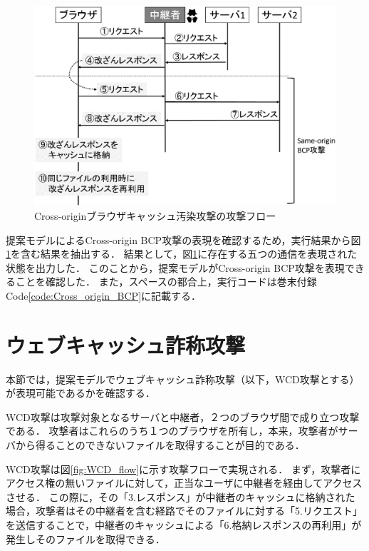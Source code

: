 \documentclass[12pt,a4paper]{jbook}
\begin{document}
\begin{figure}[htb]
\centering
\includegraphics[width=450pt]{./fig/CrossBCP_flow.eps}
\caption{Cross-originブラウザキャッシュ汚染攻撃の攻撃フロー}
\label{fig:CrossBCP_flow}
\end{figure}

提案モデルによるCross-origin BCP攻撃の表現を確認するため，実行結果から図\ref{fig:CrossBCP_flow}を含む結果を抽出する．
結果として，図\ref{fig:CrossBCP_flow}に存在する五つの通信を表現された状態を出力した．
このことから，提案モデルがCross-origin BCP攻撃を表現できることを確認した．
また，スペースの都合上，実行コードは巻末付録Code\ref{code:Cross_origin_BCP}に記載する．

\section{ウェブキャッシュ詐称攻撃}
本節では，提案モデルでウェブキャッシュ詐称攻撃\cite{WCD}（以下，WCD攻撃とする）が表現可能であるかを確認する．

WCD攻撃は攻撃対象となるサーバと中継者，２つのブラウザ間で成り立つ攻撃である．
攻撃者はこれらのうち１つのブラウザを所有し，本来，攻撃者がサーバから得ることのできないファイルを取得することが目的である．

WCD攻撃は図\ref{fig:WCD_flow}に示す攻撃フローで実現される．
まず，攻撃者にアクセス権の無いファイルに対して，正当なユーザに中継者を経由してアクセスさせる．
この際に，その「3.レスポンス」が中継者のキャッシュに格納された場合，攻撃者はその中継者を含む経路でそのファイルに対する「5.リクエスト」を送信することで，中継者のキャッシュによる「6.格納レスポンスの再利用」が発生しそのファイルを取得できる．
\end{document}
